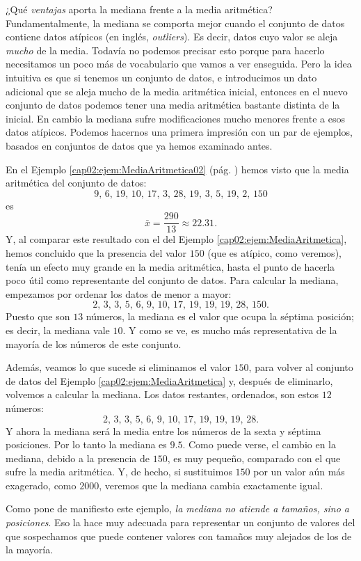 ¿Qué {\em ventajas} aporta la mediana frente a la media aritmética? Fundamentalmente, la mediana se
comporta mejor cuando el conjunto de datos contiene {\sf datos atípicos}  (en inglés, {\em outliers}). Es decir, datos cuyo
valor se aleja {\em mucho} de la media. Todavía no podemos precisar esto porque para hacerlo
necesitamos un poco más de vocabulario que vamos a ver enseguida. Pero la idea intuitiva es que si
tenemos un conjunto de datos, e introducimos un dato adicional que se aleja mucho de la media
aritmética inicial, entonces en el nuevo conjunto de datos podemos tener una media aritmética
bastante distinta de la inicial. En cambio la mediana sufre modificaciones mucho menores frente a
esos datos atípicos. Podemos hacernos una primera impresión con un par de ejemplos, basados en
conjuntos de datos que ya hemos examinado antes.
\begin{ejemplo}
\label{cap02:ejem:MedianaVsMedia}
En el Ejemplo \ref{cap02:ejem:MediaAritmetica02} (pág. \pageref{cap02:ejem:MediaAritmetica02}) hemos visto que la media aritmética del conjunto de datos:
\[9,\, 6,\, 19,\, 10,\, 17,\, 3,\, 28,\, 19,\, 3,\, 5,\, 19,\, 2,\, 150\]
es
\[\bar x=\dfrac{290}{13}\approx 22.31.\]
Y, al comparar este resultado con el del Ejemplo \ref{cap02:ejem:MediaAritmetica}, hemos concluido que la presencia del valor $150$ (que es atípico, como veremos), tenía un efecto muy grande en la media aritmética, hasta el punto de hacerla poco útil como representante del conjunto de datos. Para calcular la mediana, empezamos por ordenar los datos de menor a mayor:
\[2,\, 3,\, 3,\, 5,\, 6,\, 9,\, 10,\, 17,\, 19,\, 19,\, 19,\, 28,\, 150.\]
Puesto que son $13$ números, la mediana es el valor que ocupa la séptima posición; es decir, la mediana vale $10$.  Y como se ve, es mucho más representativa de la mayoría de los números de este conjunto.

Además, veamos lo que sucede si eliminamos el valor $150$, para volver al conjunto de datos del Ejemplo \ref{cap02:ejem:MediaAritmetica} y, después de eliminarlo, volvemos  a calcular la mediana. Los datos restantes, ordenados, son estos $12$ números:
\[2,\, 3,\, 3,\, 5,\, 6,\, 9,\, 10,\, 17,\, 19,\, 19,\, 19,\, 28.\]
Y ahora la mediana será la media entre los números de la sexta y séptima posiciones. Por lo tanto la mediana es $9.5$. Como puede verse, el cambio en la mediana, debido a la presencia de $150$, es muy pequeño, comparado con el que sufre la media aritmética. Y, de hecho, si sustituimos $150$ por un valor aún más exagerado, como $2000$, veremos que la mediana cambia exactamente igual.
\end{ejemplo}
Como pone de manifiesto este ejemplo, {\em la mediana no atiende a tamaños, sino a posiciones}. Eso la hace muy adecuada para representar un conjunto de valores del que sospechamos que puede contener valores con tamaños muy alejados de los de la mayoría.

